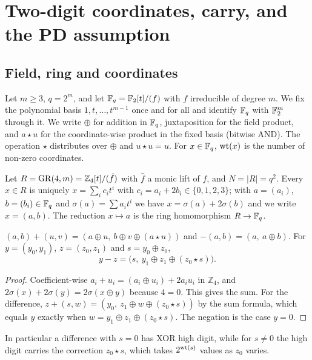 \section{Two-digit coordinates, carry, and the PD assumption}\label{sec:setup}

\subsection{Field, ring and coordinates}
Let $m\ge 3$, $q=2^m$, and let $\mathbb{F}_q=\mathbb{F}_2[t]/(f)$ with $f$ irreducible of degree $m$. We fix the
polynomial basis $1,t,\dots,t^{m-1}$ once and for all and identify $\mathbb{F}_q$ with $\mathbb{F}_2^m$ through it.
We write $\oplus$ for addition in $\mathbb{F}_q$, juxtaposition for the field product, and $a\star u$ for the
coordinate-wise product in the fixed basis (bitwise AND). The operation $\star$ distributes over
$\oplus$ and $u\star u=u$. For $x\in\mathbb{F}_q$, $\mathrm{wt}(x)$ is the number of non-zero coordinates.

Let $R=\mathrm{GR}(4,m)=\mathbb Z_4[t]/(\hat f)$ with $\hat f$ a monic lift of $f$, and $N=|R|=q^2$. Every
$x\in R$ is uniquely $x=\sum_i c_it^i$ with $c_i=a_i+2b_i\in\{0,1,2,3\}$; with $a=(a_i)$,
$b=(b_i)\in\mathbb{F}_q$ and $\sigma(a)=\sum a_it^i$ we have $x=\sigma(a)+2\sigma(b)$ and we write $x=(a,b)$.
The reduction $x\mapsto a$ is the ring homomorphism $R\to\mathbb{F}_q$.

\begin{lemma}[Carry]\label{lem:add}
$(a,b)+(u,v)=(a\oplus u,\ b\oplus v\oplus(a\star u))$ and $-(a,b)=(a,\ a\oplus b)$.
For $y=(y_0,y_1)$, $z=(z_0,z_1)$ and $s=y_0\oplus z_0$,
\[ y-z=\bigl(s,\ y_1\oplus z_1\oplus(z_0\star s)\bigr). \]
\end{lemma}
\begin{proof}
Coefficient-wise $a_i+u_i=(a_i\oplus u_i)+2a_iu_i$ in $\mathbb Z_4$, and $2\sigma(x)+2\sigma(y)=2\sigma(x\oplus y)$
because $4=0$. This gives the sum. For the difference, $z+(s,w)=(y_0,\ z_1\oplus w\oplus(z_0\star s))$
by the sum formula, which equals $y$ exactly when $w=y_1\oplus z_1\oplus(z_0\star s)$. The negation
is the case $y=0$.
\end{proof}

In particular a difference with $s=0$ has XOR high digit, while for $s\ne0$ the high digit carries
the correction $z_0\star s$, which takes $2^{\mathrm{wt}(s)}$ values as $z_0$ varies.

